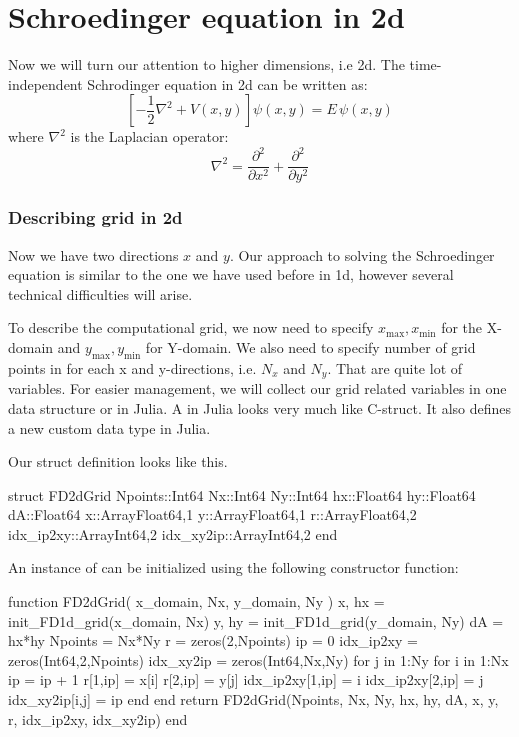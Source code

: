 \chapter{Schroedinger equation in 2d}

Now we will turn our attention to higher dimensions, i.e 2d.
The time-independent Schrodinger equation in 2d can be written as:
\begin{equation}
\left[ -\frac{1}{2}\nabla^2 + V(x,y) \right] \psi(x,y) = E\,\psi(x,y)
\label{eq:sch_2d}
\end{equation}
%
where $\nabla^2$ is the Laplacian operator:
%
\begin{equation}
\nabla^2 = \frac{\partial^2}{\partial x^2} + \frac{\partial^2}{\partial y^2}
\end{equation}



\subsection{Describing grid in 2d}

Now we have two directions $x$ and $y$. Our approach to solving the Schroedinger equation
is similar to the one we have used before in 1d, however several technical difficulties
will arise.

To describe the computational grid, we now need to specify
$x_{\mathrm{max}}, x_{\mathrm{min}}$ for the X-domain
and $y_{\mathrm{max}}, y_{\mathrm{min}}$ for Y-domain. We also need to specify number of grid
points in for each x and y-directions, i.e. $N_{x}$ and $N_{y}$. That are quite lot of variables.
For easier management, we will collect our grid related variables in one data structure or
 in Julia. A  in Julia looks very much like C-struct.
It also defines a new custom data type in Julia.

Our struct definition looks like this.
\begin{juliacode}
struct FD2dGrid
    Npoints::Int64
    Nx::Int64
    Ny::Int64
    hx::Float64
    hy::Float64
    dA::Float64
    x::Array{Float64,1}
    y::Array{Float64,1}
    r::Array{Float64,2}
    idx_ip2xy::Array{Int64,2}
    idx_xy2ip::Array{Int64,2}
end
\end{juliacode}
%
An instance of  can be initialized using the following constructor function:
%
\begin{juliacode}
function FD2dGrid( x_domain, Nx, y_domain, Ny )
    x, hx = init_FD1d_grid(x_domain, Nx)
    y, hy = init_FD1d_grid(y_domain, Ny)
    dA = hx*hy
    Npoints = Nx*Ny
    r = zeros(2,Npoints)
    ip = 0
    idx_ip2xy = zeros(Int64,2,Npoints)
    idx_xy2ip = zeros(Int64,Nx,Ny)
    for j in 1:Ny
        for i in 1:Nx
            ip = ip + 1
            r[1,ip] = x[i]
            r[2,ip] = y[j]
            idx_ip2xy[1,ip] = i
            idx_ip2xy[2,ip] = j
            idx_xy2ip[i,j] = ip
        end
    end
    return FD2dGrid(Npoints, Nx, Ny, hx, hy, dA, x, y, r, idx_ip2xy, idx_xy2ip) 
end
\end{juliacode}

